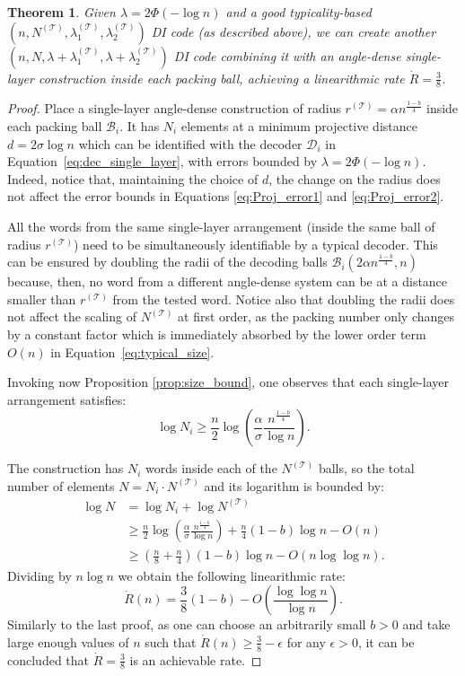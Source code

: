 \documentclass[10pt,conference]{IEEEtran}
\newtheorem{theorem}{Theorem}
\newcommand{\1}{\mathds{1}}
\newcommand{\cB}{\mathcal{B}}
\newcommand{\cD}{\mathcal{D}}
\newcommand{\cT}{\mathcal{T}}
\begin{document}
\begin{theorem}\label{thm:reproducing_3on8}
Given $\lambda=2\Phi(-\log n)$ and a good typicality-based $(n,N^{(\cT)},\lambda_1^{(\cT)},\lambda_2^{(\cT)})$ DI code (as described above), we can create another $(n,N,\lambda+\lambda_1^{(\cT)},\lambda+\lambda_2^{(\cT)})$ DI
code combining it with an angle-dense single-layer construction inside each packing ball, achieving a linearithmic rate $\dot{R}=\frac38$.
\end{theorem}
\begin{proof}
Place a single-layer angle-dense construction of radius $r^{(\cT)}=\alpha n^\frac{1-b}{4}$ inside each packing ball $\cB_i$. It has $N_i$ elements at a minimum projective distance $d=2\sigma\log n$ which can be identified with the decoder $\cD_i$ in Equation~\eqref{eq:dec_single_layer}, with errors bounded by $\lambda=2\Phi(-\log n)$. Indeed, notice that, maintaining the choice of $d$, the change on the radius does not affect the error bounds in Equations \eqref{eq:Proj_error1} and \eqref{eq:Proj_error2}. 

All the words from the same single-layer arrangement (inside the same ball of radius $r^{(\cT)}$) need to be simultaneously identifiable by a typical decoder. This can be ensured by doubling the radii of the decoding balls $\cB_{i}(2\alpha n^\frac{1-b}{4},n)$ because, then, no word from a different angle-dense system can be at a distance smaller than $r^{(\cT)}$ from the tested word. Notice also that doubling the radii does not affect the scaling of $N^{(\cT)}$ at first order, as the packing number only changes by a constant factor which is immediately absorbed by the lower order term $O(n)$ in Equation~\eqref{eq:typical_size}.

Invoking now Proposition \ref{prop:size_bound}, one observes that each single-layer arrangement satisfies:
\begin{equation}
\log N_i\geq\frac n2\log\left(\frac{\alpha}{\sigma}\frac{n^{\frac{1-b}{4}}}{\log n}\right).
\end{equation}

The construction has $N_i$ words inside each of the $N^{(\cT)}$ balls, so the total number of elements $N=N_i\cdot N^{(\cT)}$ and its logarithm is bounded by: 
\begin{equation}
\begin{split}
\!\!\log N&= \log N_i +\log N^{(\cT)}\\
&\geq\frac{n}{2}\log\left(\frac{\alpha}{\sigma}\frac{n^{\frac{1-b}{4}}}{\log n}\right)\!+\!\frac{n}{4}(1-b)\log n-O(n)\\
&\geq\left(\frac{n}{8}+\frac{n}{4}\right)(1-b)\log n-O(n\log\log n).
\end{split}
\end{equation}
Dividing by $n\log n$ we obtain the following linearithmic rate: 
\begin{equation}
    \dot{R}(n)=\frac38(1-b)-O\left(\frac{\log\log n}{\log n}\right).
\end{equation}
Similarly to the last proof, as one can choose an arbitrarily small $b>0$ and take 
large enough values of $n$ such that $\dot R(n)\geq\frac{3}{8}-\epsilon$ for any $\epsilon>0$, it can be concluded that $\dot R=\frac38$ is an achievable rate.


\end{proof}
\end{document}
